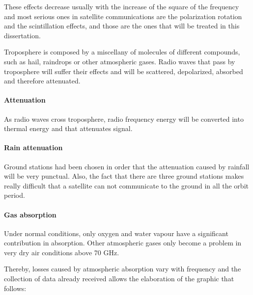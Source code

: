 These effects decrease usually with the increase of the square of the frequency and most serious ones in satellite communications are the polarization rotation and the scintillation effects, and those are the ones that will be treated in this dissertation. \cite{Jorge2012}

Troposphere is composed by a miscellany of molecules of different compounds, such as hail, raindrops or other atmospheric gases. Radio waves that pass by troposphere will suffer their effects and will be scattered, depolarized, absorbed and therefore attenuated.

\paragraph{Attenuation} As radio waves cross troposphere, radio frequency energy will be converted into thermal energy and that attenuates signal.

\paragraph{Rain attenuation} Ground stations had been chosen in order that the attenuation caused by rainfall will be very punctual. Also, the fact that there are three ground stations makes really difficult that a satellite can not communicate to the ground in all the orbit period.

\paragraph{Gas absorption} Under normal conditions, only oxygen and water vapour have a significant contribution in absorption. Other atmospheric gases only become a problem in very dry air conditions above 70 GHz.

Thereby, losses caused by atmospheric absorption vary with frequency and the
collection of data already received allows the elaboration of the graphic that follows:

